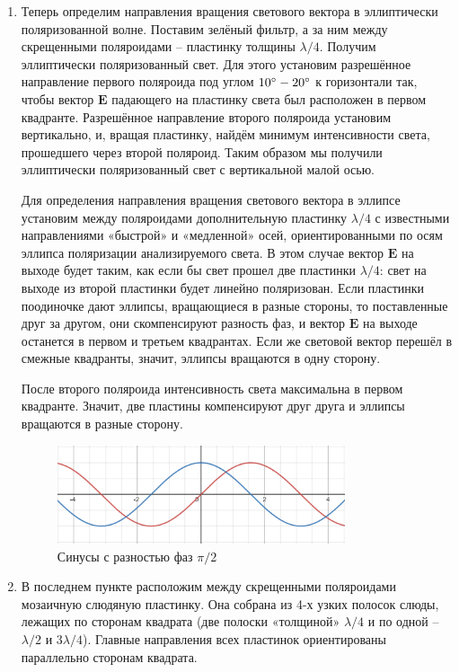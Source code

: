 \documentclass[a4paper,12pt]{article}
\begin{document}
\begin{enumerate}
    \item
    Теперь определим направления вращения светового вектора в эллиптически поляризованной волне. Поставим зелёный фильтр, а за ним между скрещенными поляроидами -- пластинку  толщины $\lambda / 4$. Получим эллиптически поляризованный свет. Для этого установим разрешённое направление первого поляроида под углом $10\degree-20\degree$ к горизонтали так, чтобы вектор $\mathbf{E}$ падающего на пластинку света был расположен в первом квадранте. Разрешённое направление второго поляроида установим вертикально, и, вращая пластинку, найдём минимум интенсивности света, прошедшего через второй поляроид. Таким образом мы получили эллиптически поляризованный свет с вертикальной малой осью. 

    Для определения направления вращения светового вектора в эллипсе установим между поляроидами дополнительную пластинку $\lambda / 4$ с известными направлениями «быстрой» и «медленной» осей, ориентированными по осям эллипса поляризации анализируемого света. В этом случае вектор $\mathbf{E}$ на выходе будет таким, как если бы свет прошел две пластинки $\lambda / 4$: свет на выходе из второй пластинки будет линейно поляризован. Если пластинки поодиночке дают эллипсы, вращающиеся в разные стороны, то поставленные друг за другом, они скомпенсируют разность фаз, и вектор $\mathbf{E}$ на выходе останется в первом и третьем квадрантах. Если же световой вектор перешёл в смежные квадранты, значит, эллипсы вращаются в одну сторону.

    После второго поляроида интенсивность света максимальна в первом квадранте. Значит, две пластины компенсируют друг друга и эллипсы вращаются в разные сторону.

    \begin{figure}[H]\label{fig: Sinuses}
        \centering
        \includegraphics[width = 0.8\textwidth]{Sinuses.png}
        \caption{Синусы с разностью фаз $\pi / 2$}
    \end{figure}

    \item
    В последнем пункте расположим между скрещенными поляроидами мозаичную слюдяную пластинку. Она собрана из 4-х узких полосок слюды, лежащих по сторонам квадрата (две полоски «толщиной» $\lambda / 4$ и по одной -- $\lambda / 2$ и $3 \lambda / 4$). Главные направления всех пластинок ориентированы параллельно сторонам квадрата.


\end{enumerate}
\end{document}
